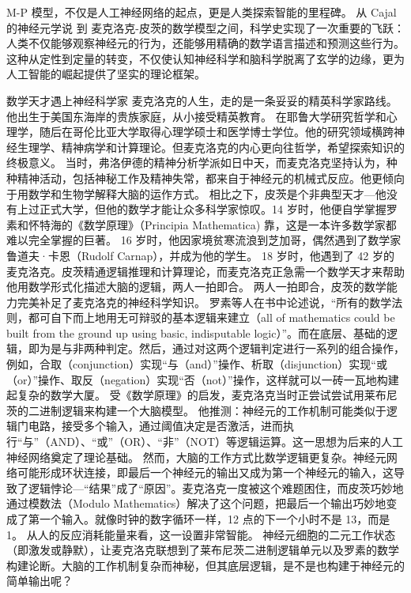 M-P 模型，不仅是人工神经网络的起点，更是人类探索智能的里程碑。
从 Cajal 的神经元学说 到 麦克洛克-皮茨的数学模型之间，科学史实现了一次重要的飞跃：人类不仅能够观察神经元的行为，还能够用精确的数学语言描述和预测这些行为。
这种从定性到定量的转变，不仅使认知神经科学和脑科学脱离了玄学的边缘，更为人工智能的崛起提供了坚实的理论框架。
\begin{story}{数学天才遇上神经科学家}
麦克洛克的人生，走的是一条妥妥的精英科学家路线。他出生于美国东海岸的贵族家庭，从小接受精英教育。
在耶鲁大学研究哲学和心理学，随后在哥伦比亚大学取得心理学硕士和医学博士学位。他的研究领域横跨神经生理学、精神病学和计算理论。但麦克洛克的内心更向往哲学，希望探索知识的终极意义。%
当时，弗洛伊德的精神分析学派如日中天，而麦克洛克坚持认为，种种精神活动，包括神秘工作及精神失常，都来自于神经元的机械式反应。他更倾向于用数学和生物学解释大脑的运作方式。
相比之下，皮茨是个非典型天才---他没有上过正式大学，但他的数学才能让众多科学家惊叹。14 岁时，他便自学掌握罗素和怀特海的《数学原理》（Principia Mathematica) 靠，这是一本许多数学家都难以完全掌握的巨著。
16 岁时，他因家境贫寒流浪到芝加哥，偶然遇到了数学家鲁道夫·卡恩（Rudolf Carnap），并成为他的学生。
18 岁时，他遇到了 42 岁的麦克洛克。皮茨精通逻辑推理和计算理论，而麦克洛克正急需一个数学天才来帮助他用数学形式化描述大脑的逻辑，两人一拍即合。
两人一拍即合，皮茨的数学能力完美补足了麦克洛克的神经科学知识。
罗素等人在书中论述说，“所有的数学法则，都可自下而上地用无可辩驳的基本逻辑来建立（all of mathematics could be built from the ground up using basic, indisputable logic）”。而在底层、基础的逻辑，即为是与非两种判定。然后，通过对这两个逻辑判定进行一系列的组合操作，例如，合取（conjunction）实现“与（and）”操作、析取（disjunction）实现“或（or）”操作、取反（negation）实现“否（not）”操作，这样就可以一砖一瓦地构建起复杂的数学大厦。
受《数学原理》的启发，麦克洛克当时正尝试尝试用莱布尼茨的二进制逻辑来构建一个大脑模型。
他推测：神经元的工作机制可能类似于逻辑门电路，接受多个输入，通过阈值决定是否激活，进而执行“与”（AND）、“或”（OR）、“非”（NOT）等逻辑运算。这一思想为后来的人工神经网络奠定了理论基础。
然而，大脑的工作方式比数学逻辑更复杂。神经元网络可能形成环状连接，即最后一个神经元的输出又成为第一个神经元的输入，这导致了逻辑悖论---“结果”成了“原因”。麦克洛克一度被这个难题困住，而皮茨巧妙地通过模数法（Modulo Mathematics）解决了这个问题，把最后一个输出巧妙地变成了第一个输入。就像时钟的数字循环一样，12 点的下一个小时不是 13，而是 1。
从人的反应消耗能量来看，这一设置非常智能。
神经元细胞的二元工作状态（即激发或静默），让麦克洛克联想到了莱布尼茨二进制逻辑单元以及罗素的数学构建论断。大脑的工作机制复杂而神秘，但其底层逻辑，是不是也构建于神经元的简单输出呢？

\end{story}
